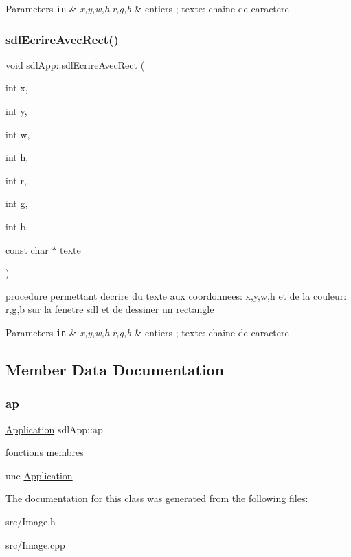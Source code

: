 \begin{DoxyParams}[1]{Parameters}
\mbox{\tt in}  & {\em x,y,w,h,r,g,b} & entiers ; texte\+: chaine de caractere \\
\hline
\end{DoxyParams}
\mbox{\label{classsdlApp_a8ccb9775a7ef085eec26a60f4564d3bd}} 
\subsubsection{\texorpdfstring{sdl\+Ecrire\+Avec\+Rect()}{sdlEcrireAvecRect()}}
{\footnotesize\ttfamily void sdl\+App\+::sdl\+Ecrire\+Avec\+Rect (\begin{DoxyParamCaption}\item[{int}]{x,  }\item[{int}]{y,  }\item[{int}]{w,  }\item[{int}]{h,  }\item[{int}]{r,  }\item[{int}]{g,  }\item[{int}]{b,  }\item[{const char $\ast$}]{texte }\end{DoxyParamCaption})}



procedure permettant d\textquotesingle{}ecrire du texte aux coordonnees\+: x,y,w,h et de la couleur\+: r,g,b sur la fenetre sdl et de dessiner un rectangle 


\begin{DoxyParams}[1]{Parameters}
\mbox{\tt in}  & {\em x,y,w,h,r,g,b} & entiers ; texte\+: chaine de caractere \\
\hline
\end{DoxyParams}


\subsection{Member Data Documentation}
\mbox{\label{classsdlApp_a721d26218fa45ca53705f1dbbee8dfba}} 
\subsubsection{\texorpdfstring{ap}{ap}}
{\footnotesize\ttfamily \mbox{\hyperlink{classApplication}{Application}} sdl\+App\+::ap}



fonctions membres 

une \mbox{\hyperlink{classApplication}{Application}} 

The documentation for this class was generated from the following files\+:\begin{DoxyCompactItemize}
\item 
src/Image.\+h\item 
src/Image.\+cpp\end{DoxyCompactItemize}
